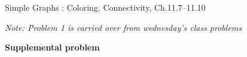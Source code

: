 \documentclass[handout]{mcs}
\begin{document}

\begin{staffnotes}
Simple Graphs : Coloring, Connectivity, Ch.11.7--11.10
\end{staffnotes}

\emph{Note: Problem 1 is carried over from wednesday's class problems}
\begin{center}
\textbf{\large Supplemental problem}
\end{center}


\end{document}

